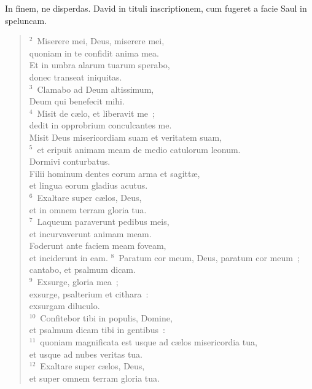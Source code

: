\lettrine[lines=3,image=true,loversize=0.05,lraise=-0.03]{I}{}n finem, ne disperdas. David in tituli inscriptionem, cum fugeret a facie Saul in speluncam.
\begin{flushleft}\begin{verse}\vspace{6pt}${}^{2}$~Miserere mei, Deus, miserere mei,\\ quoniam in te confidit anima mea.\\ Et in umbra alarum tuarum sperabo,\\ donec transeat iniquitas.\\
${}^{3}$~Clamabo ad Deum altissimum,\\ Deum qui benefecit mihi.\\
${}^{4}$~Misit de c\ae lo, et liberavit me~;\\ dedit in opprobrium conculcantes me.\\ Misit Deus misericordiam suam et veritatem suam,\\
${}^{5}$~et eripuit animam meam de medio catulorum leonum.\\ Dormivi conturbatus.\\ Filii hominum dentes eorum arma et sagitt\ae ,\\ et lingua eorum gladius acutus.\\
${}^{6}$~Exaltare super c\ae los, Deus,\\ et in omnem terram gloria tua.\\
${}^{7}$~Laqueum paraverunt pedibus meis,\\ et incurvaverunt animam meam.\\ Foderunt ante faciem meam foveam,\\ et inciderunt in eam.
${}^{8}$~Paratum cor meum, Deus, paratum cor meum~;\\ cantabo, et psalmum dicam.\\
${}^{9}$~Exsurge, gloria mea~;\\ exsurge, psalterium et cithara~:\\ exsurgam diluculo.\\
${}^{10}$~Confitebor tibi in populis, Domine,\\ et psalmum dicam tibi in gentibus~:\\
${}^{11}$~quoniam magnificata est usque ad c\ae los misericordia tua,\\ et usque ad nubes veritas tua.\\
${}^{12}$~Exaltare super c\ae los, Deus,\\ et super omnem terram gloria tua.\end{verse}\end{flushleft}



